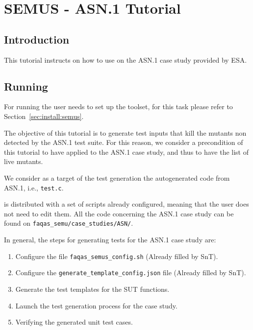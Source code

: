 
\chapter{SEMUS - ASN.1 Tutorial}
\label{chapter:semus:tutorial}

\section{Introduction}

This tutorial instructs on how to use \SEMUS on the ASN.1 case study provided by ESA.

\section{Running \SEMUS}
\label{sec:semus_running}

For running \SEMUS the user needs to set up the toolset, for this task please refer to Section~\ref{sec:install:semus}.

The objective of this tutorial is to generate test inputs that kill the mutants non detected by the ASN.1 test suite. For this reason, we consider a precondition of this tutorial to have applied \MASS to the ASN.1 case study, and thus to have the list of live mutants.

We consider as a target of the test generation the autogenerated code from ASN.1, i.e., \texttt{test.c}.

\SEMUS is distributed with a set of scripts already configured, meaning that the user does not need to edit them. All the code concerning the ASN.1 case study can be found on \texttt{faqas\_semu/case\_studies/ASN/}.

In general, the steps for generating tests for the ASN.1 case study are:

\begin{enumerate}
    \item Configure the file \texttt{faqas\_semus\_config.sh} (Already filled by SnT).
    \item Configure the \texttt{generate\_template\_config.json} file (Already filled by SnT).
    \item Generate the test templates for the SUT functions.
    \item Launch the test generation process for the case study.
    \item Verifying the generated unit test cases.
\end{enumerate}


